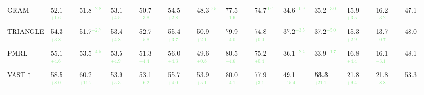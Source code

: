 \begin{table}[t]
\begin{adjustbox}{width=\textwidth,center}
\begin{tabular}{@{}l|ll|ll|ll|ll|ll|ll|c@{}}
 GRAM       & 52.1\textcolor{lightgreen}{$^\text{+1.6}$}           & 51.8\textcolor{lightgreen}{$^\text{+2.8}$}           & 53.1\textcolor{lightgreen}{$^\text{+4.5}$}           & 50.7\textcolor{lightgreen}{$^\text{+3.8}$}           & 54.5\textcolor{lightgreen}{$^\text{+2.8}$}           & 48.3\textcolor{lightgreen}{$^\text{-0.5}$}           & 77.5\textcolor{lightgreen}{$^\text{+1.6}$}           & 74.7\textcolor{lightgreen}{$^\text{-0.1}$}           & 34.6\textcolor{lightgreen}{$^\text{+0.9}$}           & 35.2\textcolor{lightgreen}{$^\text{+3.0}$}           & 15.9\textcolor{lightgreen}{$^\text{+3.5}$}           & 16.2\textcolor{lightgreen}{$^\text{+3.2}$}         & 47.1   \\
 TRIANGLE   & 54.3\textcolor{lightgreen}{$^\text{+3.8}$}           & 51.7\textcolor{lightgreen}{$^\text{+2.7}$}           & 53.4\textcolor{lightgreen}{$^\text{+4.8}$}           & 52.7\textcolor{lightgreen}{$^\text{+5.8}$}           & 55.4\textcolor{lightgreen}{$^\text{+3.7}$}           & 50.9\textcolor{lightgreen}{$^\text{+2.1}$}           & 79.9\textcolor{lightgreen}{$^\text{+4.0}$}           & 74.8\textcolor{lightgreen}{$^\text{+0.0}$}           & 37.2\textcolor{lightgreen}{$^\text{+3.5}$}           & 37.2\textcolor{lightgreen}{$^\text{+5.0}$}           & 15.3\textcolor{lightgreen}{$^\text{+2.9}$}           & 13.7\textcolor{lightgreen}{$^\text{+0.7}$}      & 48.0     \\
 PMRL       & 55.1\textcolor{lightgreen}{$^\text{+4.6}$}           & 53.5\textcolor{lightgreen}{$^\text{+4.5}$}           & 53.5\textcolor{lightgreen}{$^\text{+4.9}$}           & 51.3\textcolor{lightgreen}{$^\text{+4.4}$}           & 56.0\textcolor{lightgreen}{$^\text{+4.3}$}           & 49.6\textcolor{lightgreen}{$^\text{+0.8}$}           & 80.5\textcolor{lightgreen}{$^\text{+4.6}$}           & 75.2\textcolor{lightgreen}{$^\text{+0.4}$}           & 36.1\textcolor{lightgreen}{$^\text{+2.4}$}           & 33.9\textcolor{lightgreen}{$^\text{+1.7}$}           & 16.8\textcolor{lightgreen}{$^\text{+4.4}$}           & 16.1\textcolor{lightgreen}{$^\text{+3.1}$}      & 48.1        \\
 \midrule
VAST$\uparrow$        & 58.5\textcolor{lightgreen}{$^\text{+8.0}$}            & \underline{60.2}\textcolor{lightgreen}{$^\text{+11.2}$}           & 53.9\textcolor{lightgreen}{$^\text{+5.3}$}           & 53.1\textcolor{lightgreen}{$^\text{+6.2}$}           & 55.7\textcolor{lightgreen}{$^\text{+4.0}$}           & \underline{53.9}\textcolor{lightgreen}{$^\text{+5.1}$}           & 80.0\textcolor{lightgreen}{$^\text{+4.1}$}           & 77.9\textcolor{lightgreen}{$^\text{+3.1}$}           & 49.1\textcolor{lightgreen}{$^\text{+15.4}$}           & \textbf{53.3\textcolor{lightgreen}{$^\text{+21.1}$}}           & 21.8\textcolor{lightgreen}{$^\text{+9.4}$}            & 21.8\textcolor{lightgreen}{$^\text{+8.8}$}     & 53.3       \\

\end{tabular}
\end{adjustbox}
\end{table}
